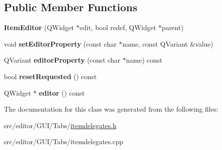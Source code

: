 \subsection*{\-Public \-Member \-Functions}
\begin{DoxyCompactItemize}
\item 
\hypertarget{class_item_editor_a9ca5d5d8d4ae77e378d069c57dc18ba5}{{\bfseries \-Item\-Editor} (\-Q\-Widget $\ast$edit, bool redef, \-Q\-Widget $\ast$parent)}\label{class_item_editor_a9ca5d5d8d4ae77e378d069c57dc18ba5}

\item 
\hypertarget{class_item_editor_a71ede1af77c2de8f7d1229ccada47f9a}{void {\bfseries set\-Editor\-Property} (const char $\ast$name, const \-Q\-Variant \&value)}\label{class_item_editor_a71ede1af77c2de8f7d1229ccada47f9a}

\item 
\hypertarget{class_item_editor_a782c5756b983fc5993ad65636d4737c5}{\-Q\-Variant {\bfseries editor\-Property} (const char $\ast$name) const }\label{class_item_editor_a782c5756b983fc5993ad65636d4737c5}

\item 
\hypertarget{class_item_editor_ac1ef2ff64a85a0cf7e03483d4c256ee1}{bool {\bfseries reset\-Requested} () const }\label{class_item_editor_ac1ef2ff64a85a0cf7e03483d4c256ee1}

\item 
\hypertarget{class_item_editor_a59d16e179b2526834559467e752e8db0}{\-Q\-Widget $\ast$ {\bfseries editor} () const }\label{class_item_editor_a59d16e179b2526834559467e752e8db0}

\end{DoxyCompactItemize}


\-The documentation for this class was generated from the following files\-:\begin{DoxyCompactItemize}
\item 
src/editor/\-G\-U\-I/\-Tabs/\hyperlink{itemdelegates_8h}{itemdelegates.\-h}\item 
src/editor/\-G\-U\-I/\-Tabs/itemdelegates.\-cpp\end{DoxyCompactItemize}
